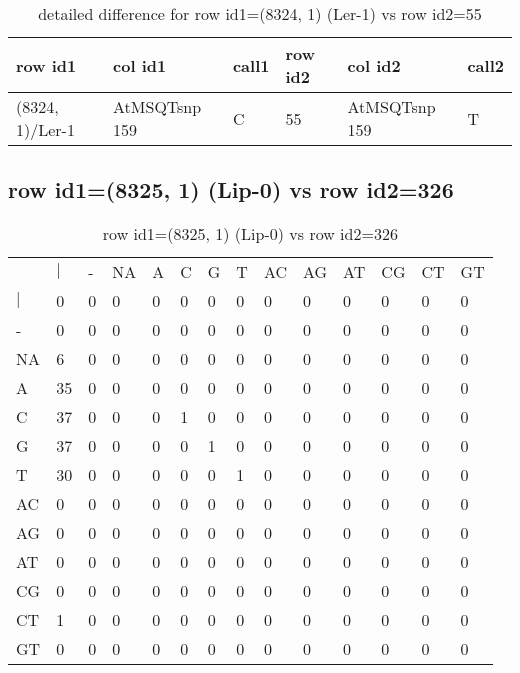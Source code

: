 \begin{center}
\begin{longtable}{|l|l|l|l|l|l|}
\caption{detailed difference for row id1=(8324, 1) (Ler-1) vs row id2=55} \label{table_dm517}\\
\hline
row id1&col id1&call1&row id2&col id2&call2\\
\hline
(8324, 1)/Ler-1&AtMSQTsnp 159&C&55&AtMSQTsnp 159&T\\
\hline
\end{longtable}
\end{center}

\subsection{row id1=(8325, 1) (Lip-0) vs row id2=326}
\begin{center}
\begin{longtable}{|l|l|l|l|l|l|l|l|l|l|l|l|l|l|}
\caption{row id1=(8325, 1) (Lip-0) vs row id2=326} \label{table_dm518}\\
\hline
\\
\hline
&$|$&-&NA&A&C&G&T&AC&AG&AT&CG&CT&GT\\
$|$&0&0&0&0&0&0&0&0&0&0&0&0&0\\
-&0&0&0&0&0&0&0&0&0&0&0&0&0\\
NA&6&0&0&0&0&0&0&0&0&0&0&0&0\\
A&35&0&0&0&0&0&0&0&0&0&0&0&0\\
C&37&0&0&0&1&0&0&0&0&0&0&0&0\\
G&37&0&0&0&0&1&0&0&0&0&0&0&0\\
T&30&0&0&0&0&0&1&0&0&0&0&0&0\\
AC&0&0&0&0&0&0&0&0&0&0&0&0&0\\
AG&0&0&0&0&0&0&0&0&0&0&0&0&0\\
AT&0&0&0&0&0&0&0&0&0&0&0&0&0\\
CG&0&0&0&0&0&0&0&0&0&0&0&0&0\\
CT&1&0&0&0&0&0&0&0&0&0&0&0&0\\
GT&0&0&0&0&0&0&0&0&0&0&0&0&0\\
\hline
\end{longtable}
\end{center}

